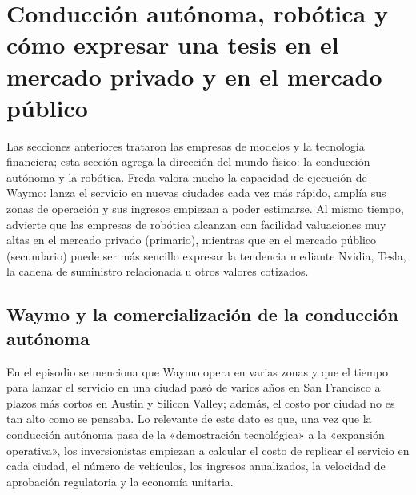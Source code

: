 \section{Conducción autónoma, robótica y cómo expresar una tesis en el mercado privado y en el mercado público}

Las secciones anteriores trataron las empresas de modelos y la tecnología financiera; esta sección agrega la dirección del mundo físico: la conducción autónoma y la robótica. Freda valora mucho la capacidad de ejecución de Waymo: lanza el servicio en nuevas ciudades cada vez más rápido, amplía sus zonas de operación y sus ingresos empiezan a poder estimarse. Al mismo tiempo, advierte que las empresas de robótica alcanzan con facilidad valuaciones muy altas en el mercado privado (primario), mientras que en el mercado público (secundario) puede ser más sencillo expresar la tendencia mediante Nvidia, Tesla, la cadena de suministro relacionada u otros valores cotizados.

\subsection{Waymo y la comercialización de la conducción autónoma}

En el episodio se menciona que Waymo opera en varias zonas y que el tiempo para lanzar el servicio en una ciudad pasó de varios años en San Francisco a plazos más cortos en Austin y Silicon Valley; además, el costo por ciudad no es tan alto como se pensaba. Lo relevante de este dato es que, una vez que la conducción autónoma pasa de la «demostración tecnológica» a la «expansión operativa», los inversionistas empiezan a calcular el costo de replicar el servicio en cada ciudad, el número de vehículos, los ingresos anualizados, la velocidad de aprobación regulatoria y la economía unitaria.

